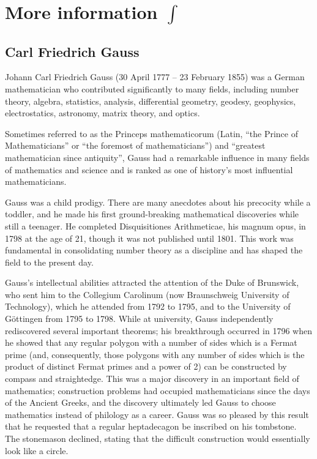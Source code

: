 \chapter{More information $\int$}

\section*{Carl Friedrich Gauss}

Johann Carl Friedrich Gauss (30 April 1777 -- 23 February 1855) was a German mathematician who contributed significantly to many fields, including number theory, algebra, statistics, analysis, differential geometry, geodesy, geophysics, electrostatics, astronomy, matrix theory, and optics.

Sometimes referred to as the Princeps mathematicorum (Latin, ``the Prince of Mathematicians'' or ``the foremost of mathematicians'') and ``greatest mathematician since antiquity'', Gauss had a remarkable influence in many fields of mathematics and science and is ranked as one of history's most influential mathematicians.

Gauss was a child prodigy. There are many anecdotes about his precocity while a toddler, and he made his first ground-breaking mathematical discoveries while still a teenager. He completed Disquisitiones Arithmeticae, his magnum opus, in 1798 at the age of 21, though it was not published until 1801. This work was fundamental in consolidating number theory as a discipline and has shaped the field to the present day.

Gauss's intellectual abilities attracted the attention of the Duke of Brunswick, who sent him to the Collegium Carolinum (now Braunschweig University of Technology), which he attended from 1792 to 1795, and to the University of G\"{o}ttingen from 1795 to 1798. While at university, Gauss independently rediscovered several important theorems; his breakthrough occurred in 1796 when he showed that any regular polygon with a number of sides which is a Fermat prime (and, consequently, those polygons with any number of sides which is the product of distinct Fermat primes and a power of 2) can be constructed by compass and straightedge. This was a major discovery in an important field of mathematics; construction problems had occupied mathematicians since the days of the Ancient Greeks, and the discovery ultimately led Gauss to choose mathematics instead of philology as a career. Gauss was so pleased by this result that he requested that a regular heptadecagon be inscribed on his tombstone. The stonemason declined, stating that the difficult construction would essentially look like a circle.

